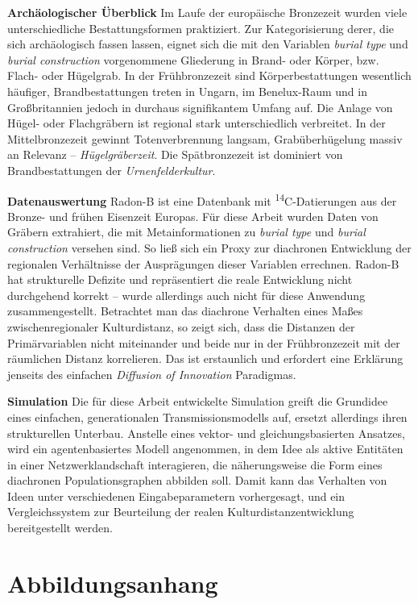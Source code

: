 \documentclass[openany,twoside,twocolumn]{book}
\renewcommand{\printbibliography}{}
\begin{document}
\textbf{Archäologischer Überblick} \newline 
Im Laufe der europäische Bronzezeit wurden viele unterschiedliche Bestattungsformen praktiziert. Zur Kategorisierung derer, die sich archäologisch fassen lassen, eignet sich die mit den Variablen \emph{burial type} und \emph{burial construction} vorgenommene Gliederung in Brand- oder Körper, bzw. Flach- oder Hügelgrab. In der Frühbronzezeit sind Körperbestattungen wesentlich häufiger, Brandbestattungen treten in Ungarn, im Benelux-Raum und in Großbritannien jedoch in durchaus signifikantem Umfang auf. Die Anlage von Hügel- oder Flachgräbern ist regional stark unterschiedlich verbreitet. In der Mittelbronzezeit gewinnt Totenverbrennung langsam, Grabüberhügelung massiv an Relevanz -- \emph{Hügelgräberzeit}. Die Spätbronzezeit ist dominiert von Brandbestattungen der \emph{Urnenfelderkultur}.

\textbf{Datenauswertung} \newline 
Radon-B ist eine Datenbank mit \textsuperscript{14}C-Datierungen aus der Bronze- und frühen Eisenzeit Europas. Für diese Arbeit wurden Daten von Gräbern extrahiert, die mit Metainformationen zu \emph{burial type} und \emph{burial construction} versehen sind. So ließ sich ein Proxy zur diachronen Entwicklung der regionalen Verhältnisse der Ausprägungen dieser Variablen errechnen. Radon-B hat strukturelle Defizite und repräsentiert die reale Entwicklung nicht durchgehend korrekt -- wurde allerdings auch nicht für diese Anwendung zusammengestellt. Betrachtet man das diachrone Verhalten eines Maßes zwischenregionaler Kulturdistanz, so zeigt sich, dass die Distanzen der Primärvariablen nicht miteinander und beide nur in der Frühbronzezeit mit der räumlichen Distanz korrelieren. Das ist erstaunlich und erfordert eine Erklärung jenseits des einfachen \emph{Diffusion of Innovation} Paradigmas.

\textbf{Simulation} \newline 
Die für diese Arbeit entwickelte Simulation greift die Grundidee eines einfachen, generationalen Transmissionsmodells auf, ersetzt allerdings ihren strukturellen Unterbau. Anstelle eines vektor- und gleichungsbasierten Ansatzes, wird ein agentenbasiertes Modell angenommen, in dem Idee als aktive Entitäten in einer Netzwerklandschaft interagieren, die näherungsweise die Form eines diachronen Populationsgraphen abbilden soll. Damit kann das Verhalten von Ideen unter verschiedenen Eingabeparametern vorhergesagt, und ein Vergleichssystem zur Beurteilung der realen Kulturdistanzentwicklung bereitgestellt werden.

\hypertarget{abbildungsanhang}{%
\chapter{Abbildungsanhang}\label{abbildungsanhang}}

\begingroup
\let\clearpage\relax
\listoffigures
\endgroup

\printbibliography
\end{document}
